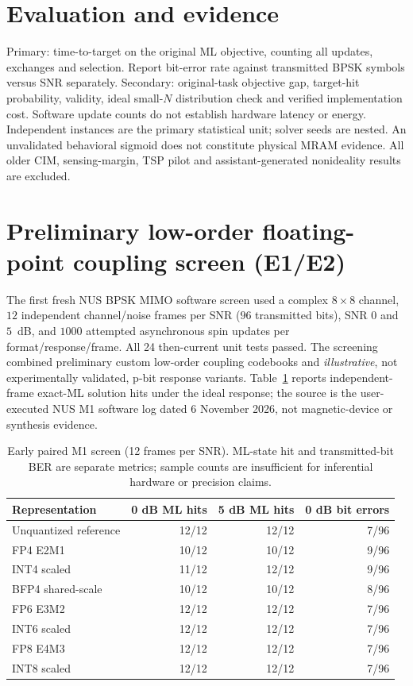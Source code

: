 \documentclass[11pt,a4paper]{article}
\begin{document}
\section{Evaluation and evidence}
Primary: time-to-target on the original ML objective, counting all updates, exchanges and selection. Report bit-error rate against transmitted BPSK symbols versus SNR separately. Secondary: original-task objective gap, target-hit probability, validity, ideal small-$N$ distribution check and verified implementation cost. Software update counts do not establish hardware latency or energy. Independent instances are the primary statistical unit; solver seeds are nested. An unvalidated behavioral sigmoid does not constitute physical MRAM evidence. All older CIM, sensing-margin, TSP pilot and assistant-generated nonideality results are excluded.
\section{Preliminary low-order floating-point coupling screen (E1/E2)}
The first fresh NUS BPSK MIMO software screen used a complex $8\times8$ channel,
$12$ independent channel/noise frames per SNR ($96$ transmitted bits),
SNR $0$ and $5$~dB, and $1000$ attempted asynchronous spin updates per
format/response/frame. All 24 then-current unit tests passed.
The screening combined preliminary custom low-order coupling codebooks and
\emph{illustrative}, not experimentally validated, p-bit response variants.
Table~\ref{tab:m1pilot} reports independent-frame exact-ML solution hits
under the ideal response; the source is the user-executed NUS M1 software
log dated 6 November 2026, not magnetic-device or synthesis evidence.
\begin{table}[htbp]
\centering\small
\begin{tabular}{@{}lrrr@{}}\toprule
Representation & 0 dB ML hits & 5 dB ML hits & 0 dB bit errors\\\midrule
Unquantized reference & 12/12 & 12/12 & 7/96\\
FP4 E2M1 & 10/12 & 10/12 & 9/96\\
INT4 scaled & 11/12 & 12/12 & 9/96\\
BFP4 shared-scale & 10/12 & 10/12 & 8/96\\
FP6 E3M2 & 12/12 & 12/12 & 7/96\\
INT6 scaled & 12/12 & 12/12 & 7/96\\
FP8 E4M3 & 12/12 & 12/12 & 7/96\\
INT8 scaled & 12/12 & 12/12 & 7/96\\\bottomrule
\end{tabular}
\caption{Early paired M1 screen (12 frames per SNR). ML-state hit
and transmitted-bit BER are separate metrics; sample counts are insufficient
for inferential hardware or precision claims.}
\label{tab:m1pilot}
\end{table}
\end{document}

